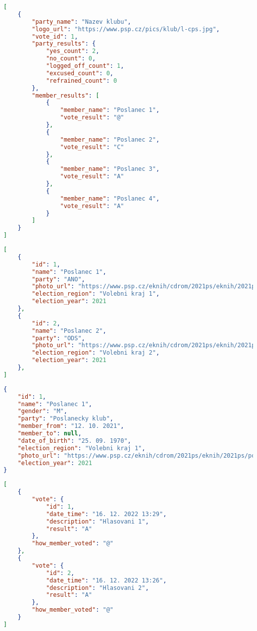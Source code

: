 \newpage

\begin{lstlisting}[caption={Tělo odpovědi pro dotaz \lstinline{GET /api/party/vote/1}}, label={fig:party-vote-1}, language=json,firstnumber=1,tabsize=2]
[
	{
		"party_name": "Nazev klubu",
		"logo_url": "https://www.psp.cz/pics/klub/l-cps.jpg",
		"vote_id": 1,
		"party_results": {
			"yes_count": 2,
			"no_count": 0,
			"logged_off_count": 1,
			"excused_count": 0,
			"refrained_count": 0
		},
		"member_results": [
			{
				"member_name": "Poslanec 1",
				"vote_result": "@"
			},
			{
				"member_name": "Poslanec 2",
				"vote_result": "C"
			},
			{
				"member_name": "Poslanec 3",
				"vote_result": "A"
			},
			{
				"member_name": "Poslanec 4",
				"vote_result": "A"
			}
		]
	}
]
\end{lstlisting}

\newpage

\begin{lstlisting}[caption={Tělo odpovědi pro dotaz \lstinline|GET /api/member|}, label={fig:member}, language=json,firstnumber=1,tabsize=2]
[
	{
		"id": 1,
		"name": "Poslanec 1",
		"party": "ANO",
		"photo_url": "https://www.psp.cz/eknih/cdrom/2021ps/eknih/2021ps/poslanci/i6474.jpg",
		"election_region": "Volebni kraj 1",
		"election_year": 2021
	},
	{
		"id": 2,
		"name": "Poslanec 2",
		"party": "ODS",
		"photo_url": "https://www.psp.cz/eknih/cdrom/2021ps/eknih/2021ps/poslanci/i6804.jpg",
		"election_region": "Volebni kraj 2",
		"election_year": 2021
	},
]
\end{lstlisting}

\begin{lstlisting}[caption={Tělo odpovědi pro dotaz \lstinline{GET /api/member/1}}, label={fig:member-1}, language=json,firstnumber=1,tabsize=2]
{
	"id": 1,
	"name": "Poslanec 1",
	"gender": "M",
	"party": "Poslanecky klub",
	"member_from": "12. 10. 2021",
	"member_to": null,
	"date_of_birth": "25. 09. 1970",
	"election_region": "Volebni kraj 1",
	"photo_url": "https://www.psp.cz/eknih/cdrom/2021ps/eknih/2021ps/poslanci/i6474.jpg",
	"election_year": 2021
}
\end{lstlisting}

\newpage

\begin{lstlisting}[caption={Tělo odpovědi pro dotaz \lstinline{GET /api/member/1/vote}}, label={fig:member-vote-1}, language=json,firstnumber=1,tabsize=2]
[
	{
		"vote": {
			"id": 1,
			"date_time": "16. 12. 2022 13:29",
			"description": "Hlasovani 1",
			"result": "A"
		},
		"how_member_voted": "@"
	},
	{
		"vote": {
			"id": 2,
			"date_time": "16. 12. 2022 13:26",
			"description": "Hlasovani 2",
			"result": "A"
		},
		"how_member_voted": "@"
	}
]
\end{lstlisting}

